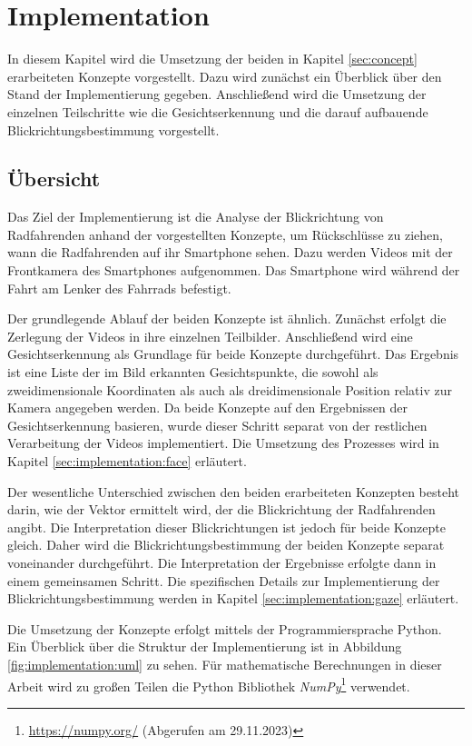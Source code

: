 \chapter{Implementation}\label{sec:implementation}

In diesem Kapitel wird die Umsetzung der beiden in Kapitel \ref{sec:concept} erarbeiteten Konzepte vorgestellt. Dazu wird zunächst ein Überblick über den Stand der Implementierung gegeben. Anschließend wird die Umsetzung der einzelnen Teilschritte wie die Gesichtserkennung und die darauf aufbauende Blickrichtungsbestimmung vorgestellt.

\section{Übersicht}

Das Ziel der Implementierung ist die Analyse der Blickrichtung von Radfahrenden anhand der vorgestellten Konzepte, um Rückschlüsse zu ziehen, wann die Radfahrenden auf ihr Smartphone sehen. Dazu werden Videos mit der Frontkamera des Smartphones aufgenommen. Das Smartphone wird während der Fahrt am Lenker des Fahrrads befestigt.

Der grundlegende Ablauf der beiden Konzepte ist ähnlich. Zunächst erfolgt die Zerlegung der Videos in ihre einzelnen Teilbilder. Anschließend wird eine Gesichtserkennung als Grundlage für beide Konzepte durchgeführt. Das Ergebnis ist eine Liste der im Bild erkannten Gesichtspunkte, die sowohl als zweidimensionale Koordinaten als auch als dreidimensionale Position relativ zur Kamera angegeben werden. Da beide Konzepte auf den Ergebnissen der Gesichtserkennung basieren, wurde dieser Schritt separat von der restlichen Verarbeitung der Videos implementiert. Die Umsetzung des Prozesses wird in Kapitel \ref{sec:implementation:face} erläutert.

Der wesentliche Unterschied zwischen den beiden erarbeiteten Konzepten besteht darin, wie der Vektor ermittelt wird, der die Blickrichtung der Radfahrenden angibt. Die Interpretation dieser Blickrichtungen ist jedoch für beide Konzepte gleich.
Daher wird die Blickrichtungsbestimmung der beiden Konzepte separat voneinander durchgeführt. Die Interpretation der Ergebnisse erfolgte dann in einem gemeinsamen Schritt. Die spezifischen Details zur Implementierung der Blickrichtungsbestimmung werden in Kapitel \ref{sec:implementation:gaze} erläutert.

Die Umsetzung der Konzepte erfolgt mittels der Programmiersprache Python. Ein Überblick über die Struktur der Implementierung ist in Abbildung \ref{fig:implementation:uml} zu sehen. Für mathematische Berechnungen in dieser Arbeit wird zu großen Teilen die Python Bibliothek \textit{NumPy}\footnote{\url{https://numpy.org/} (Abgerufen am 29.11.2023)} verwendet.

